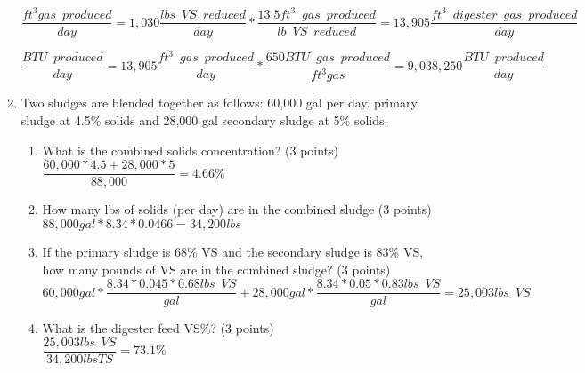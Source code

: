 \begin{enumerate}
{
$
	\dfrac 
	{
	ft^3 gas \enspace produced
	}
	{
	day
	}
	=
	1,030 \dfrac
			{
			lbs \enspace VS \enspace reduced
			}
			{
			day
			}
			*
		\dfrac
		{
		13.5 ft^3 \enspace gas \enspace produced
		}
		{
		lb \enspace VS \enspace reduced
		}
		=13,905 \dfrac
				{
				ft^3 \enspace digester \enspace 					gas \enspace produced
				}
				{
				day
				}
$
}\\
\vspace{3mm}



{
$
	\dfrac 
	{
	BTU \enspace produced
	}
	{
	day
	}
	=
	13,905 \dfrac
			{
			ft^3 \enspace gas \enspace produced
			}
			{
			day
			}
			*
		\dfrac
		{
		650 BTU \enspace gas \enspace produced
		}
		{
		ft^3 gas
		}
		=9,038,250 \dfrac
				{
				BTU \enspace produced
				}
				{
				day
				}
$
}

\item Two sludges are blended together as follows: 60,000 gal per day. primary sludge at 4.5\% solids and 28,000 gal secondary sludge at 5\% solids. 
\begin{enumerate}
\item What is the combined solids concentration?  (3 points)\\

$\dfrac{60,000*4.5+28,000*5}{88,000}=\boxed{4.66\%}$\\
\vspace{2cm}
\item How many lbs of solids (per day) are in the combined sludge (3 points)\\

$88,000 gal*8.34*0.0466 = \boxed{34,200 lbs}$\\
\vspace{2cm}


\item If the primary sludge is 68\% VS and the secondary sludge is 83\% VS, how many pounds of VS are in the combined sludge? (3 points)\\
$60,000 gal *\dfrac{8.34*0.045*0.68lbs \enspace VS}{gal}+28,000 gal *\dfrac{8.34*0.05*0.83lbs \enspace VS}{gal}=\boxed{25,003 lbs \enspace VS}$
\vspace{2cm}

\item What is the digester feed VS\%?  (3 points)\\
$\dfrac{25,003 lbs \enspace VS}{34,200 lbs TS}=\boxed{73.1\%}$

\vspace{2cm}




\end{enumerate}
\end{enumerate}
